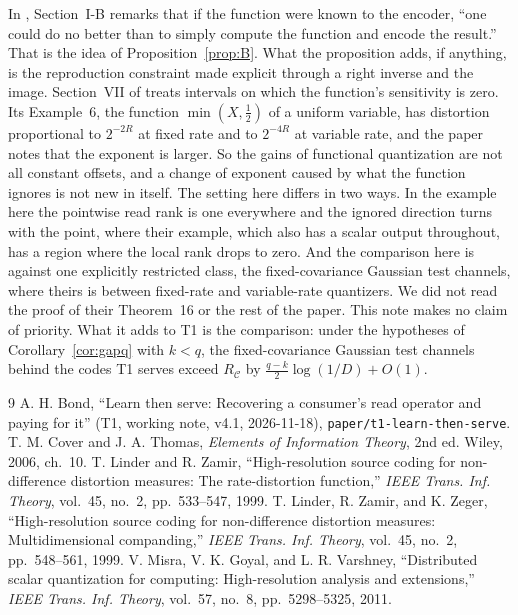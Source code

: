 \documentclass[11pt,onecolumn]{IEEEtran}
\newcommand{\RC}{R_{\mathcal C}}
\begin{document}
In \cite{misra}, Section~I-B remarks that if the function were known to the encoder,
``one could do no better than to simply compute the function and encode the result.''
That is the idea of Proposition~\ref{prop:B}. What the proposition adds, if anything, is
the reproduction constraint made explicit through a right inverse and the image. Section~VII
of \cite{misra} treats intervals on which the function's sensitivity is zero. Its
Example~6, the function $\min(X,\tfrac12)$ of a uniform variable, has distortion
proportional to $2^{-2R}$ at fixed rate and to $2^{-4R}$ at variable rate, and the paper
notes that the exponent is larger. So the gains of functional quantization are not all
constant offsets, and a change of exponent caused by what the function ignores is not new
in itself. The setting here differs in two ways. In the example here the pointwise read rank is one everywhere and the
ignored direction turns with the point, where their example, which also has a scalar
output throughout, has a region where the local rank drops to zero. And the comparison here is against one explicitly restricted class, the
fixed-covariance Gaussian test channels, where theirs is between fixed-rate and
variable-rate quantizers. We did not read the proof of their Theorem~16 or the rest of the
paper. This note makes no claim of priority. What it adds to T1 is the comparison: under
the hypotheses of Corollary~\ref{cor:gapq} with $k<q$, the fixed-covariance Gaussian test
channels behind the codes T1 serves exceed $\RC$ by $\tfrac{q-k}2\log(1/D)+O(1)$.

\begin{thebibliography}{9}
 A. H. Bond, ``Learn then serve: Recovering a consumer's read operator and
paying for it'' (T1, working note, v4.1, 2026-11-18),
\texttt{paper/t1-learn-then-serve}.
 T. M. Cover and J. A. Thomas, \emph{Elements of Information
Theory}, 2nd ed. Wiley, 2006, ch.~10.
 T. Linder and R. Zamir, ``High-resolution source coding
for non-difference distortion measures: The rate-distortion function,''
\emph{IEEE Trans. Inf. Theory}, vol.~45, no.~2, pp.~533--547, 1999.
 T. Linder, R. Zamir, and K. Zeger, ``High-resolution source
coding for non-difference distortion measures: Multidimensional companding,''
\emph{IEEE Trans. Inf. Theory}, vol.~45, no.~2, pp.~548--561, 1999.
 V. Misra, V. K. Goyal, and L. R. Varshney, ``Distributed scalar
quantization for computing: High-resolution analysis and extensions,''
\emph{IEEE Trans. Inf. Theory}, vol.~57, no.~8, pp.~5298--5325, 2011.
\end{thebibliography}
\end{document}
